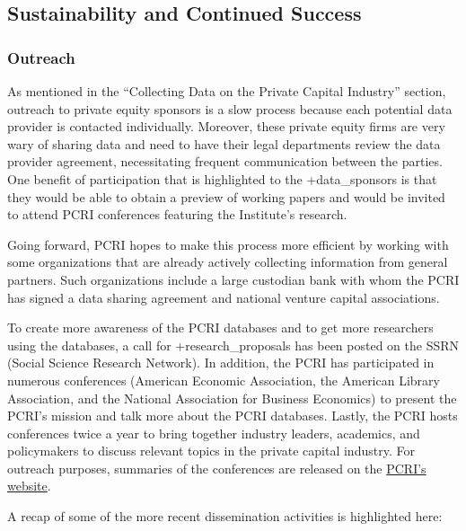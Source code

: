 \documentclass[
]{WileySix}
\begin{document}
\hypertarget{sustainability-and-continued-success-3}{%
\subsection{Sustainability and Continued Success}\label{sustainability-and-continued-success-3}}

\hypertarget{outreach-3}{%
\subsubsection{Outreach}\label{outreach-3}}

As mentioned in the ``Collecting Data on the Private Capital Industry'' section, outreach to private equity sponsors is a slow process because each potential data provider is contacted individually. Moreover, these private equity firms are very wary of sharing data and need to have their legal departments review the data provider agreement, necessitating frequent communication between the parties. One benefit of participation that is highlighted to the +data\_sponsors\textbar{} is that they would be able to obtain a preview of working papers and would be invited to attend PCRI conferences featuring the Institute's research.

Going forward, PCRI hopes to make this process more efficient by working with some organizations that are already actively collecting information from general partners. Such organizations include a large custodian bank with whom the PCRI has signed a data sharing agreement and national venture capital associations.

To create more awareness of the PCRI databases and to get more researchers using the databases, a call for +research\_proposals\textbar{} has been posted on the SSRN (Social Science Research Network). In addition, the PCRI has participated in numerous conferences (American Economic Association, the American Library Association, and the National Association for Business Economics) to present the PCRI's mission and talk more about the PCRI databases. Lastly, the PCRI hosts conferences twice a year to bring together industry leaders, academics, and policymakers to discuss relevant topics in the private capital industry. For outreach purposes, summaries of the conferences are released on the \href{http://www.privatecapitalresearchinstitute.org/}{PCRI's website}.

A recap of some of the more recent dissemination activities is highlighted here:
\end{document}
